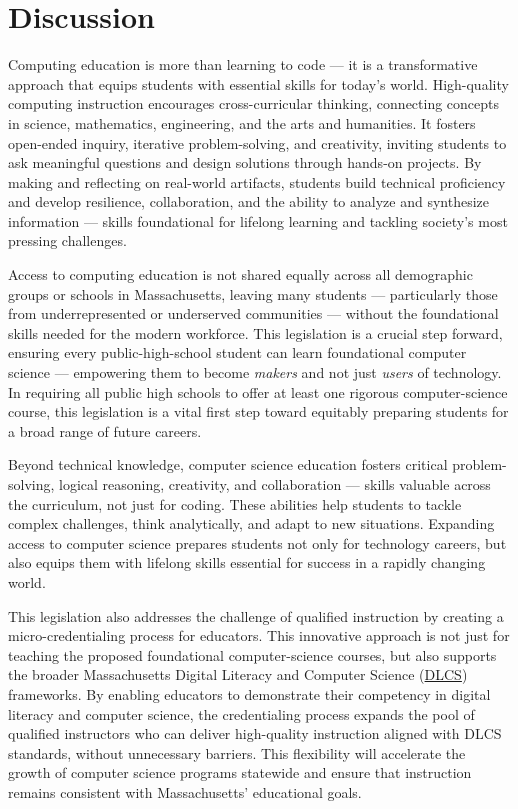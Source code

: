 \documentclass[12pt]{article}%
\begin{document}
\section{Discussion}
\label{Discussion}

Computing education is more than learning to code --- it is a transformative approach that equips students with essential skills for today's world. High-quality computing instruction encourages cross-curricular thinking, connecting concepts in science, mathematics, engineering, and the arts and humanities. It fosters open-ended inquiry, iterative problem-solving, and creativity, inviting students to ask meaningful questions and design solutions through hands-on projects. By making and reflecting on real-world artifacts, students build technical proficiency and develop resilience, collaboration, and the ability to analyze and synthesize information --- skills foundational for lifelong learning and tackling society's most pressing challenges.

Access to computing education is not shared equally across all demographic groups or schools in Massachusetts, leaving many students --- particularly those from underrepresented or underserved communities --- without the foundational skills needed for the modern workforce. This legislation is a crucial step forward, ensuring every public-high-school student can learn foundational computer science --- empowering them to become \textit{makers} and not just \textit{users} of technology. In requiring all public high schools to offer at least one rigorous computer-science course, this legislation is a vital first step toward equitably preparing students for a broad range of future careers.

Beyond technical knowledge, computer science education fosters critical problem-solving, logical reasoning, creativity, and collaboration --- skills valuable across the curriculum, not just for coding. These abilities help students to tackle complex challenges, think analytically, and adapt to new situations. Expanding access to computer science prepares students not only for technology careers, but also equips them with lifelong skills essential for success in a rapidly changing world.

This legislation also addresses the challenge of qualified instruction by creating a micro-credentialing process for educators. This innovative approach is not just for teaching the proposed foundational computer-science courses, but also supports the broader Massachusetts Digital Literacy and Computer Science (\href{https://www.doe.mass.edu/frameworks/dlcs.pdf}{DLCS}) frameworks. By enabling educators to demonstrate their competency in digital literacy and computer science, the credentialing process expands the pool of qualified instructors who can deliver high-quality instruction aligned with DLCS standards, without unnecessary barriers. This flexibility will accelerate the growth of computer science programs statewide and ensure that instruction remains consistent with Massachusetts' educational goals.
\end{document}
